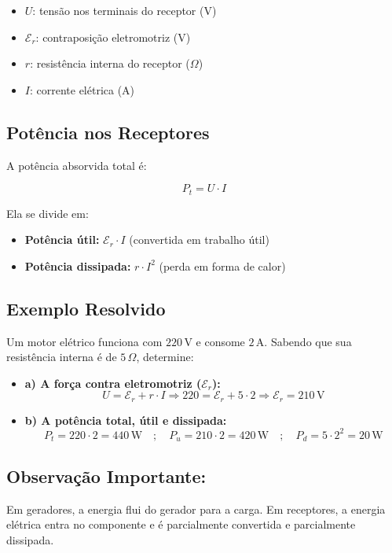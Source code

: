 \begin{itemize}
    \item $U$: tensão nos terminais do receptor (V)
    \item $\mathcal{E}_r$: contraposição eletromotriz (V)
    \item $r$: resistência interna do receptor ($\Omega$)
    \item $I$: corrente elétrica (A)
\end{itemize}

\subsection{Potência nos Receptores}
A potência absorvida total é:

\[
P_t = U \cdot I
\]

Ela se divide em:
\begin{itemize}
    \item \textbf{Potência útil:} $\mathcal{E}_r \cdot I$ (convertida em trabalho útil)
    \item \textbf{Potência dissipada:} $r \cdot I^2$ (perda em forma de calor)
\end{itemize}

\subsection{Exemplo Resolvido}
Um motor elétrico funciona com $220\,\text{V}$ e consome $2\,\text{A}$. Sabendo que sua resistência interna é de $5\,\Omega$, determine:

\begin{itemize}
    \item \textbf{a) A força contra eletromotriz ($\mathcal{E}_r$):}
    \[
    U = \mathcal{E}_r + r \cdot I \Rightarrow 220 = \mathcal{E}_r + 5 \cdot 2
    \Rightarrow \mathcal{E}_r = 210\,\text{V}
    \]

    \item \textbf{b) A potência total, útil e dissipada:}
    \[
    P_t = 220 \cdot 2 = 440\,\text{W}
    \quad ; \quad
    P_u = 210 \cdot 2 = 420\,\text{W}
    \quad ; \quad
    P_d = 5 \cdot 2^2 = 20\,\text{W}
    \]
\end{itemize}

\subsection{Observação Importante:}
Em geradores, a energia flui do gerador para a carga. Em receptores, a energia elétrica entra no componente e é parcialmente convertida e parcialmente dissipada.

